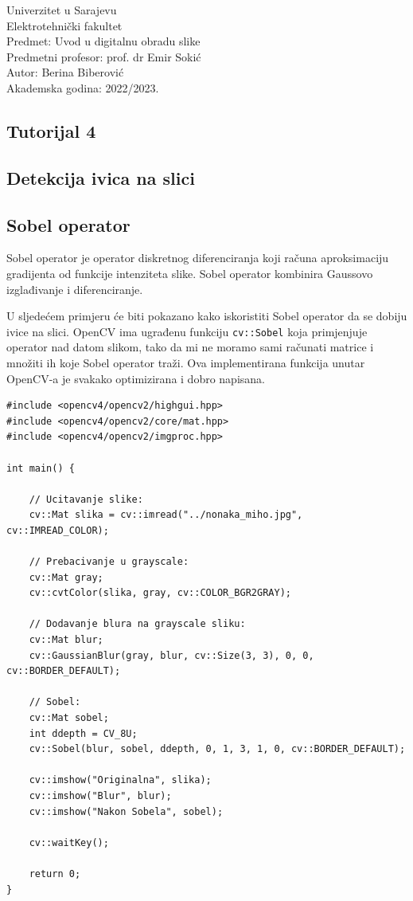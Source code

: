 \documentclass[a4paper, 12pt]{article}
\begin{document}
\noindent
Univerzitet u Sarajevu\\
Elektrotehnički fakultet\\
Predmet: Uvod u digitalnu obradu slike\\
Predmetni profesor: prof. dr Emir Sokić\\
Autor: Berina Biberović\\
Akademska godina: 2022/2023.


\begin{center}
    \section*{Tutorijal 4}
    \subsection*{Detekcija ivica na slici}
\end{center}

\subsection*{Sobel operator}

Sobel operator je operator diskretnog diferenciranja koji računa aproksimaciju gradijenta od funkcije intenziteta slike. Sobel operator kombinira Gaussovo izglađivanje i diferenciranje.

U sljedećem primjeru će biti pokazano kako iskoristiti Sobel operator da se dobiju ivice na slici. OpenCV ima ugrađenu funkciju \lstinline{cv::Sobel} koja primjenjuje operator nad datom slikom, tako da mi ne moramo sami računati matrice i množiti ih koje Sobel operator traži. Ova implementirana funkcija unutar OpenCV-a je svakako optimizirana i dobro napisana.

\begin{lstlisting}
#include <opencv4/opencv2/highgui.hpp>
#include <opencv4/opencv2/core/mat.hpp>
#include <opencv4/opencv2/imgproc.hpp>

int main() {

    // Ucitavanje slike:
    cv::Mat slika = cv::imread("../nonaka_miho.jpg", cv::IMREAD_COLOR);

    // Prebacivanje u grayscale:
    cv::Mat gray;
    cv::cvtColor(slika, gray, cv::COLOR_BGR2GRAY);

    // Dodavanje blura na grayscale sliku:
    cv::Mat blur;
    cv::GaussianBlur(gray, blur, cv::Size(3, 3), 0, 0, cv::BORDER_DEFAULT);

    // Sobel:
    cv::Mat sobel;
    int ddepth = CV_8U;
    cv::Sobel(blur, sobel, ddepth, 0, 1, 3, 1, 0, cv::BORDER_DEFAULT);

    cv::imshow("Originalna", slika);
    cv::imshow("Blur", blur);
    cv::imshow("Nakon Sobela", sobel);

    cv::waitKey();

    return 0;
}
\end{lstlisting}
\end{document}
